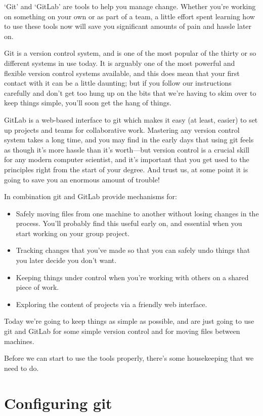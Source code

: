 `Git' and `GitLab' are tools to help you manage change. Whether you're working on something on your own or as part of a team, a little effort spent learning how to use these tools now will save you significant amounts of pain and hassle later on. 

Git is a version control system, and is one of the most popular of the thirty or so different systems in use today. It is arguably one of the most powerful and flexible version control systems available, and this does mean that your first contact with it can be a little daunting; but if you follow our instructions carefully and don't get too hung up on the bits that we're having to skim over to keep things simple, you'll soon get the hang of things. 

GitLab is a web-based interface to git which makes it easy (at least, easier) to set up projects and teams for collaborative work. Mastering any version control system takes a long time, and you may find in the early days that using git feels as though it's more hassle than it's worth---but version control is a crucial skill for any modern computer scientist, and it's important that you get used to the principles right from the start of your degree. And trust us, at some point it is going to save you an enormous amount of trouble!

In combination git and GitLab provide mechanisms for:
\begin{itemize}
\item Safely moving files from one machine to another without losing changes in the process. You'll probably find this useful early on, and essential when you start working on your group project.
\item Tracking changes that you've made so that you can safely undo things that you later decide you don't want.
\item Keeping things under control when you're working with others on a shared piece of work.
\item Exploring the content of projects via a friendly web interface.
\end{itemize}

Today we're going to keep things as simple as possible, and are just going to use git and GitLab for some simple version control and for moving files between machines.

Before we can start to use the tools properly, there's some housekeeping that we need to do. 

\section{Configuring git}

